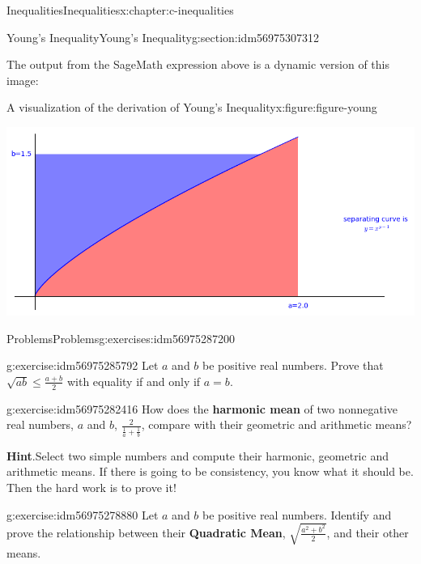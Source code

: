 \documentclass[twoside,10pt,]{book}
\newcommand{\blocktitlefont}{\relax}
\newcommand{\terminology}[1]{\textbf{#1}}
\numberwithin{equation}{section}
\begin{document}
\begin{chapterptx}{Inequalities}{}{Inequalities}{}{}{x:chapter:c-inequalities}
\begin{sectionptx}{Young's Inequality}{}{Young's Inequality}{}{}{g:section:idm56975307312}
\begin{sageoutput}
\end{sageoutput}
The output from the SageMath expression above is a dynamic version of this image:%
\begin{figureptx}{A visualization of the derivation of Young's Inequality}{x:figure:figure-young}{}%
\begin{image}{0}{1}{0}%
\includegraphics[width=\linewidth]{images/young.png}
\end{image}%
\tcblower
\end{figureptx}%
\end{sectionptx}
%
%
\typeout{************************************************}
\typeout{************************************************}
%
\begin{exercises-section}{Problems}{}{Problems}{}{}{g:exercises:idm56975287200}
\begin{divisionexercise}{1}{}{}{g:exercise:idm56975285792}%
Let \(a\) and \(b\) be positive real numbers. Prove that \(\sqrt{a b}\leq \frac{a+b}{2}\)  with equality if and only if \(a=b\).%
\end{divisionexercise}%
\begin{divisionexercise}{2}{}{}{g:exercise:idm56975282416}%
%
How does the \terminology{harmonic mean} of two nonnegative real numbers, \(a\) and \(b\),  \(\frac{2}{\frac{1}{a}+\frac{1}{b}}\), compare with their geometric and arithmetic means?%
\par\smallskip%
\noindent\textbf{\blocktitlefont Hint}.\hypertarget{g:hint:idm56975279456}{}\quad{}Select two simple numbers and compute their harmonic, geometric and arithmetic means.  If there is going to be consistency, you know what it should be.  Then the hard work is to prove it!%
\end{divisionexercise}%
\begin{divisionexercise}{3}{}{}{g:exercise:idm56975278880}%
%
Let \(a\) and \(b\) be positive real numbers. Identify and prove the relationship between their \terminology{Quadratic Mean}, \(\sqrt{\frac{a^2 + b^2}{2}}\), and their other means.%

\end{divisionexercise}
\end{exercises-section}
\end{chapterptx}
\end{document}
